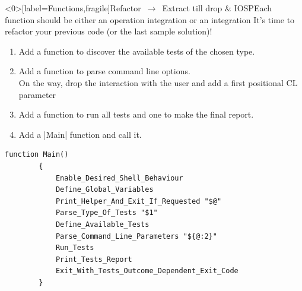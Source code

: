 \begin{frame}<0>[label=Functions,fragile]{Refactor $\,\to\,$ Extract till drop \& IOSP}{Each function should be either an operation integration or an integration}
    \vspace{-2mm}
    \alert{It's time to refactor your previous code (or the last sample solution)!}
    \begin{enumerate}
        \item Add a function to discover the available tests of the chosen type.
        \item Add a function to parse command line options.\\
              \then On the way, drop the interaction with the user and add a first positional CL parameter
        \item Add a function to run all tests and one to make the final report.
        \item Add a \bash|Main| function and call it.
    \end{enumerate}
    \begin{lstlisting}[style=MyBash, numbers=none, aboveskip=3mm]
        function Main()
        {
            Enable_Desired_Shell_Behaviour
            Define_Global_Variables
            Print_Helper_And_Exit_If_Requested "$@"
            Parse_Type_Of_Tests "$1"
            Define_Available_Tests
            Parse_Command_Line_Parameters "${@:2}"
            Run_Tests
            Print_Tests_Report
            Exit_With_Tests_Outcome_Dependent_Exit_Code
        }
    \end{lstlisting}

\end{frame}
